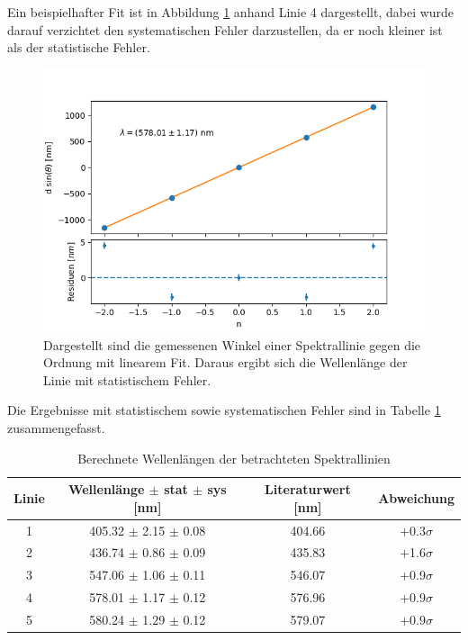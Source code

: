 \documentclass[12pt,a4paper]{article}
\begin{document}
	Ein beispielhafter Fit ist in Abbildung \ref{fig:fit_wellenlaengen} anhand Linie 4 dargestellt, dabei wurde darauf verzichtet den systematischen Fehler darzustellen, da er noch kleiner ist als der statistische Fehler.
	
	\begin{figure}
		\centering
		\includegraphics[scale=1.0]{Bilder/Gitter_Regression_Wellenlaengen_Linie_4.png}
		\caption{Dargestellt sind die gemessenen Winkel einer Spektrallinie gegen die Ordnung mit linearem Fit. Daraus ergibt sich die Wellenlänge der Linie mit statistischem Fehler.}
		\label{fig:fit_wellenlaengen}
	\end{figure}
	
	Die Ergebnisse mit statistischem sowie systematischen Fehler sind in Tabelle \ref{tab:ergebnisse_wellenlängen} zusammengefasst.
	
	\begin{table}
		\centering
		\begin{tabular}{|c|c|c|c|}
			\hline
			Linie & Wellenlänge $\pm$ stat $\pm$ sys [nm] & Literaturwert [nm] & Abweichung\\
			\hline
			\hline
			1 & 405.32 $\pm$ 2.15 $\pm$ 0.08 & 404.66 & +0.3$\sigma$ \\
			\hline
			2 & 436.74 $\pm$ 0.86 $\pm$ 0.09 & 435.83 & +1.6$\sigma$ \\
			\hline
			3 & 547.06 $\pm$ 1.06 $\pm$ 0.11 & 546.07 & +0.9$\sigma$ \\
			\hline
			4 & 578.01 $\pm$ 1.17 $\pm$ 0.12 & 576.96 & +0.9$\sigma$ \\
			\hline
			5 & 580.24 $\pm$ 1.29 $\pm$ 0.12 & 579.07 & +0.9$\sigma$\\
			\hline
		\end{tabular}
		\caption{Berechnete Wellenlängen der betrachteten Spektrallinien}
		\label{tab:ergebnisse_wellenlängen}
	\end{table}
	
\end{document}
